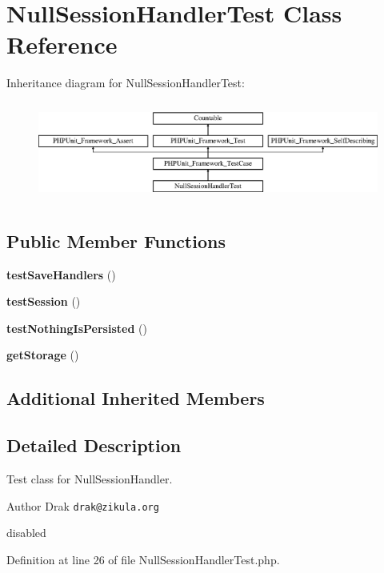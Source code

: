 \section{Null\+Session\+Handler\+Test Class Reference}
\label{class_symfony_1_1_component_1_1_http_foundation_1_1_tests_1_1_session_1_1_storage_1_1_handler_1_1_null_session_handler_test}
Inheritance diagram for Null\+Session\+Handler\+Test\+:\begin{figure}[H]
\begin{center}
\leavevmode
\includegraphics[height=3.303835cm]{class_symfony_1_1_component_1_1_http_foundation_1_1_tests_1_1_session_1_1_storage_1_1_handler_1_1_null_session_handler_test}
\end{center}
\end{figure}
\subsection*{Public Member Functions}
\begin{DoxyCompactItemize}
\item 
{\bf test\+Save\+Handlers} ()
\item 
{\bf test\+Session} ()
\item 
{\bf test\+Nothing\+Is\+Persisted} ()
\item 
{\bf get\+Storage} ()
\end{DoxyCompactItemize}
\subsection*{Additional Inherited Members}


\subsection{Detailed Description}
Test class for Null\+Session\+Handler.

\begin{DoxyAuthor}{Author}
Drak {\tt drak@zikula.\+org}
\end{DoxyAuthor}
disabled 

Definition at line 26 of file Null\+Session\+Handler\+Test.\+php.




